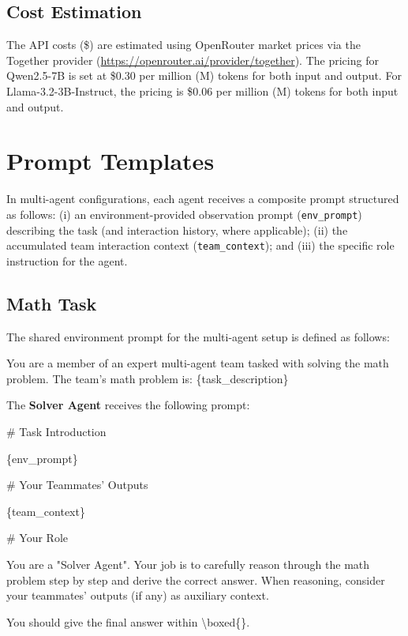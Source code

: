 \subsection{Cost Estimation}
The API costs (\$) are estimated using OpenRouter market prices via the Together provider (\url{https://openrouter.ai/provider/together}). The pricing for Qwen2.5-7B is set at \$0.30 per million (M) tokens for both input and output. For Llama-3.2-3B-Instruct, the pricing is \$0.06 per million (M) tokens for both input and output.

\section{Prompt Templates}

In multi-agent configurations, each agent receives a composite prompt structured as follows:
(i) an environment-provided observation prompt (\texttt{env\_prompt}) describing the task (and interaction history, where applicable);
(ii) the accumulated team interaction context (\texttt{team\_context}); and
(iii) the specific role instruction for the agent.

\subsection{Math Task}
The shared environment prompt for the multi-agent setup is defined as follows:

\begin{promptbox}[title=Environment Prompt]
You are a member of an expert multi-agent team tasked with solving the math problem.
The team's math problem is: \{task\_description\}
\end{promptbox}

The \textbf{Solver Agent} receives the following prompt:

\begin{promptbox}[title=Solver Agent Prompt]
\# Task Introduction

\{env\_prompt\}

\# Your Teammates' Outputs

\{team\_context\}

\# Your Role

You are a "Solver Agent". Your job is to carefully reason through the math problem step by step and derive the correct answer. When reasoning, consider your teammates' outputs (if any) as auxiliary context.

You should give the final answer within \textbackslash boxed\{\}.
\end{promptbox}


